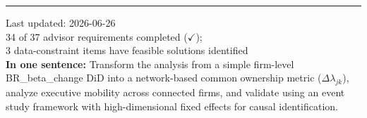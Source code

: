 \documentclass[11pt,a4paper]{article}
\begin{document}
\vspace{1cm}

\rule{\textwidth}{0.4pt}
\begin{center}
{\footnotesize\color{gray}
Last updated: 2026-06-26 \\
34 of 37 advisor requirements completed (\(\checkmark\));\\
3 data-constraint items have feasible solutions identified\\
{\bf In one sentence:} Transform the analysis from a simple firm-level BR\_beta\_change DiD into a network-based common ownership metric (\(\Delta\lambda_{jk}\)), analyze executive mobility across connected firms, and validate using an event study framework with high-dimensional fixed effects for causal identification.
}
\end{center}
\end{document}
